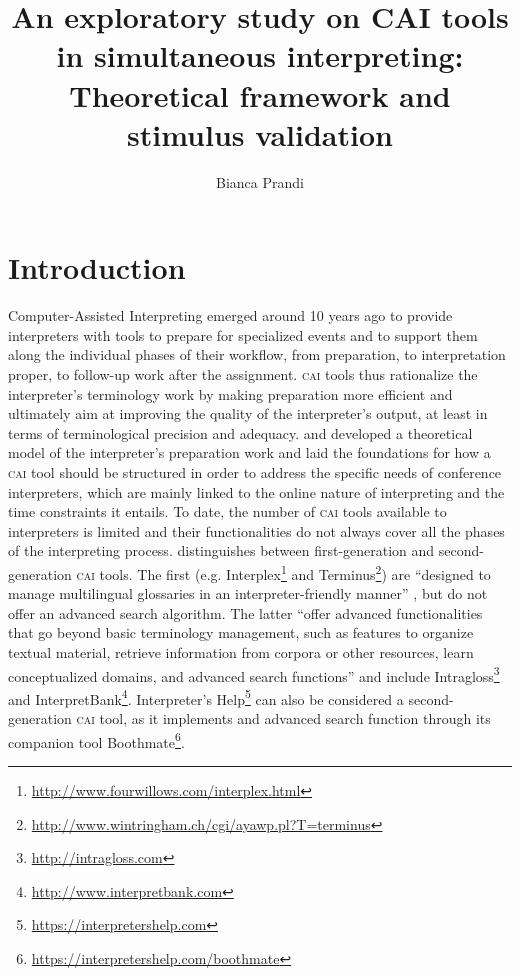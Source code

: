 \documentclass[output=paper]{langsci/langscibook}
\author{Bianca Prandi\affiliation{University of Mainz}}
\title{An exploratory study on CAI tools in simultaneous interpreting: Theoretical framework and stimulus validation}
\begin{document}
\section{Introduction}\label{sec:prandi:1}
Computer-Assisted Interpreting emerged around 10 years ago to provide interpreters with tools to prepare for specialized events and to support them along the individual phases of their workflow, from preparation, to interpretation proper, to follow-up work after the assignment. \textsc{cai} tools thus rationalize the interpret\-er’s terminology work by making preparation more efficient and ultimately aim at improving the quality of the interpreter’s output, at least in terms of terminological precision and adequacy. \citet{Rütten2007} and \citet{Will2009} developed a theoretical model of the interpreter’s preparation work and laid the foundations for how a \textsc{cai} tool should be structured in order to address the specific needs of conference interpreters, which are mainly linked to the online nature of interpreting and the time constraints it entails.
To date, the number of \textsc{cai} tools available to interpreters is limited and their functionalities do not always cover all the phases of the interpreting process. \citet{Fantinuoli2018} distinguishes between first-generation and second-generation \textsc{cai} tools. The first (e.g. Interplex\footnote{\url{http://www.fourwillows.com/interplex.html}} and Terminus\footnote{\url{http://www.wintringham.ch/cgi/ayawp.pl?T=terminus}}) are ``designed to manage multilingual glossaries in an interpreter-friendly manner'' \citep[164]{Fantinuoli2018}, but do not offer an advanced search algorithm. The latter ``offer advanced functionalities that go beyond basic terminology management, such as features to organize textual material, retrieve information from corpora or other resources, learn conceptualized domains, and advanced search functions'' \citep[164]{Fantinuoli2018} and include Intragloss\footnote{\url{http://intragloss.com}} and InterpretBank\footnote{\url{http://www.interpretbank.com}}. Interpreter’s Help\footnote{\url{https://interpretershelp.com}} can also be considered a second-generation \textsc{cai} tool, as it implements and advanced search function through its companion tool Boothmate\footnote{\url{https://interpretershelp.com/boothmate}}. 
\end{document}
